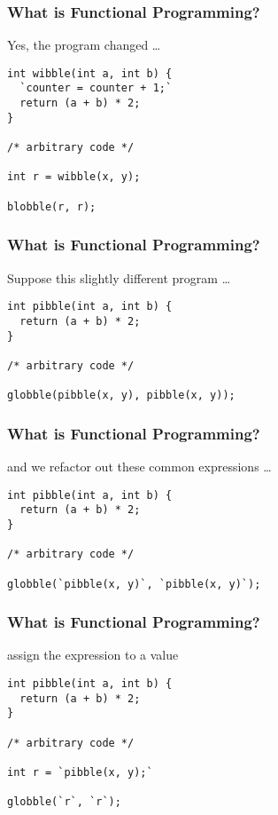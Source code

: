 \begin{frame}[fragile]
\frametitle{What is Functional Programming?}
\begin{block}{Yes, the program changed \ldots}
\begin{lstlisting}[style=java]
int wibble(int a, int b) {
  `counter = counter + 1;`
  return (a + b) * 2;
}

/* arbitrary code */

int r = wibble(x, y);

blobble(r, r);
\end{lstlisting}
\end{block}
\end{frame}

\begin{frame}[fragile]
\frametitle{What is Functional Programming?}
\begin{block}{Suppose this slightly different program \ldots}
\begin{lstlisting}[style=java]
int pibble(int a, int b) {
  return (a + b) * 2;
}

/* arbitrary code */

globble(pibble(x, y), pibble(x, y));
\end{lstlisting}
\end{block}
\end{frame}

\begin{frame}[fragile]
\frametitle{What is Functional Programming?}
\begin{block}{and we refactor out these common expressions \ldots}
\begin{lstlisting}[style=java]
int pibble(int a, int b) {
  return (a + b) * 2;
}

/* arbitrary code */

globble(`pibble(x, y)`, `pibble(x, y)`);
\end{lstlisting}
\end{block}
\end{frame}

\begin{frame}[fragile]
\frametitle{What is Functional Programming?}
\begin{block}{assign the expression to a value}
\begin{lstlisting}[style=java]
int pibble(int a, int b) {
  return (a + b) * 2;
}

/* arbitrary code */

int r = `pibble(x, y);`

globble(`r`, `r`);
\end{lstlisting}
\end{block}
\end{frame}

